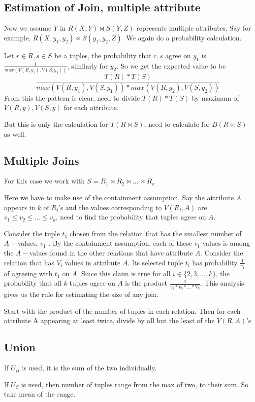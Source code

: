 \subsection{Estimation of Join, multiple attribute}
Now we assume $Y$ in $R(X, Y) \bowtie S(Y, Z)$ represents multiple attributes. Say for example, $R(X, y_1, y_2) \bowtie S(y_1, y_2, Z)$. We again do a probability calculation.
\par Let $r \in R, s \in S$ be a tuples, the probability that $r,s$ agree on $y_1$ is $\frac{1}{max(V(R,y_1), V(S,y_1))}$, similarly for $y_2$. So we get the expected value to be
$$\frac{T(R)*T(S)}{max(V(R,y_1), V(S,y_1))*max(V(R,y_2), V(S,y_2))}$$ 
From this the pattern is clear, need to divide $T(R)*T(S)$ by maximum of $V(R,y), V(S,y)$ for each attribute.
\par But this is only the calculation for $T(R\bowtie S)$, need to calculate for $B(R\bowtie S)$ as well.

\subsection{Multiple Joins}
For this case we work with $S = R_1 \bowtie R_2 \bowtie ... \bowtie R_n$
\par Here we have to make use of the containment assumption. Say the attribute $A$ appears in $k$ of $R_i$'s and the values corresponding to $V(R_i,A)$ are $v_1 \leq v_2 \leq ... \leq v_k$, need to find the probability that tuples agree on $A$.
\par Consider the tuple $t_1$ chosen from the relation that has the small­est number of $A-$values, $v_1$ . By the containment assumption, each of these $v_1$ values is among the $A-$values found in the other relations that have attribute $A$. Consider the relation that has $V_i$ values in attribute $A$. Its selected tuple $t_i$ has probability $\frac{1}{v_1}$ of agreeing with $t_1$ on $A$. Since this claim is true for all $i \in \{2, 3,..., k\}$, the probability that all $k$ tuples agree on $A$ is the product $\frac{1}{v_2 * v_3 *...* V_k}$. This analysis gives us the rule for estimating the size of any join.
\par Start with the product of the number of tuples in each relation. Then for each attribute A appearing at least twice, divide by all but the least of the $V(R, A)$'s

\subsection{Union}
If $U_B$ is used, it is the sum of the two individually. 
\par If $U_S$ is used, then number of tuples range from the max of two, to their sum. So take mean of the range.

